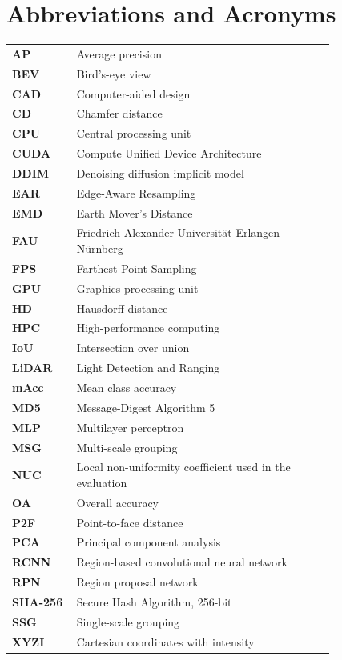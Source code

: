 \chapter{Abbreviations and Acronyms}
\begin{singlespace}
\noindent\begin{tabular}{@{}>{\bfseries}lL{0.80\linewidth}@{}}
AP & Average precision\\
BEV & Bird's-eye view\\
CAD & Computer-aided design\\
CD & Chamfer distance\\
CPU & Central processing unit\\
CUDA & Compute Unified Device Architecture\\
DDIM & Denoising diffusion implicit model\\
EAR & Edge-Aware Resampling\\
EMD & Earth Mover's Distance\\
FAU & Friedrich-Alexander-Universit\"at Erlangen-N\"urnberg\\
FPS & Farthest Point Sampling\\
GPU & Graphics processing unit\\
HD & Hausdorff distance\\
HPC & High-performance computing\\
IoU & Intersection over union\\
LiDAR & Light Detection and Ranging\\
mAcc & Mean class accuracy\\
MD5 & Message-Digest Algorithm 5\\
MLP & Multilayer perceptron\\
MSG & Multi-scale grouping\\
NUC & Local non-uniformity coefficient used in the evaluation\\
OA & Overall accuracy\\
P2F & Point-to-face distance\\
PCA & Principal component analysis\\
RCNN & Region-based convolutional neural network\\
RPN & Region proposal network\\
SHA-256 & Secure Hash Algorithm, 256-bit\\
SSG & Single-scale grouping\\
XYZI & Cartesian coordinates with intensity\\
\end{tabular}
\end{singlespace}
